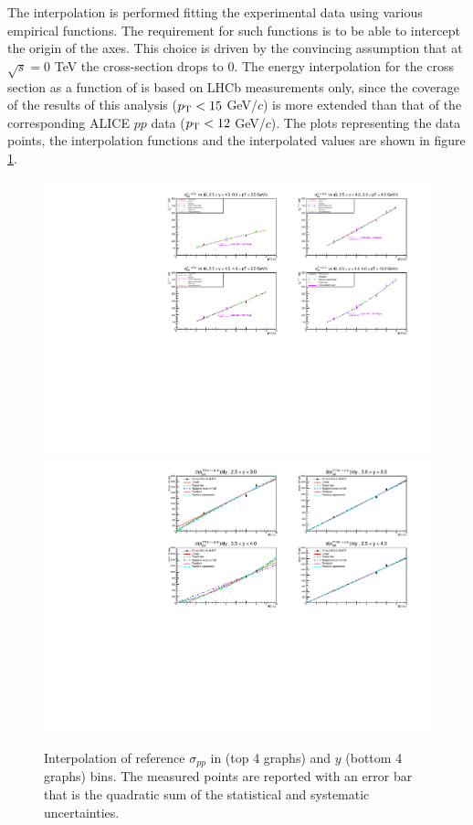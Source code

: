 The interpolation is performed fitting the experimental data using various empirical functions.
The requirement for such functions is to be able to intercept the origin of the axes.
This choice is driven by the convincing assumption that at $\sqrt{s}=0$ \rm{TeV}  the cross-section drops to $0$.
The energy interpolation for the \upsis cross section as a function of \pt is based on LHCb measurements only, since the  \pt coverage of the results of this analysis ($p_{\rm T} < 15$ GeV/$c$) is more extended than that of the corresponding ALICE $pp$ data ($p_{\rm T} < 12$ GeV/$c$).
The plots representing the data points, the interpolation functions and the interpolated values are shown in figure \ref{fig:sigmapp}.

\begin{figure}[!b]
\begin{center}
\includegraphics[width=0.95\linewidth]{Chapters/Analysis/Figs/sigmapp_vs_pt.pdf}
\includegraphics[width=0.95\linewidth]{Chapters/Analysis/Figs/sigmapp_vs_y.pdf}
\caption{Interpolation of reference $\sigma_{pp}$ in \pt (top 4 graphs) and $y$ (bottom 4 graphs) bins. The measured points are reported with an error bar that is the quadratic sum of the statistical and systematic uncertainties.}
\label{fig:sigmapp}
\end{center}
\end{figure}

